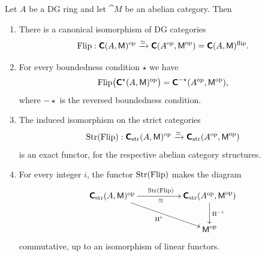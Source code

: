 \begin{thm} \label{thm:2495}
Let $A$ be a DG ring and let $\cat{M}$ be an abelian category. Then\tup{:}
\begin{enumerate}
\item There is a canonical isomorphism of DG categories  
\[ \operatorname{Flip} : 
\boldsymbol{\mathsf{C}}(A, \operatorname{\mathsf{M}})^{\mathrm{op}} \xrightarrow{\simeq} 
\boldsymbol{\mathsf{C}}(A^{\mathrm{op}}, \operatorname{\mathsf{M}}^{\mathrm{op}}) = \boldsymbol{\mathsf{C}}(A, \operatorname{\mathsf{M}})^{\mathrm{flip}} . 
\]

\item For every boundedness condition $\star$ we have 
\[ \operatorname{Flip} \bigl( \boldsymbol{\mathsf{C}}^{\star}(A, \operatorname{\mathsf{M}})^{\mathrm{op}} \bigr) = 
\boldsymbol{\mathsf{C}}^{-\star}(A^{\mathrm{op}}, \operatorname{\mathsf{M}}^{\mathrm{op}}) , \]
where $-\star$ is the reversed boundedness condition. 

\item The induced isomorphism on the strict categories
\[ \operatorname{Str}(\operatorname{Flip}) : \boldsymbol{\mathsf{C}}_{\mathrm{str}}(A, \operatorname{\mathsf{M}})^{\mathrm{op}} \xrightarrow{\simeq} 
\boldsymbol{\mathsf{C}}_{\mathrm{str}}(A^{\mathrm{op}}, \operatorname{\mathsf{M}}^{\mathrm{op}}) \]
is an exact functor, for the respective abelian category structures.

\item For every integer $i$, the functor $\operatorname{Str}(\operatorname{Flip})$ makes the 
diagram 
\[ \UseTips  \xymatrix @C=12ex @R=6ex {
\dcat{C}_{\mrm{str}}(A, \cat{M})^{\mrm{op}}
\ar[r]^{\opn{Str}(\opn{Flip})}_{\cong}
\ar[dr]_{\opn{H}^i}
&
\dcat{C}_{\mrm{str}}(A^{\mrm{op}}, \cat{M}^{\mrm{op}})
\ar[d]^{\opn{H}^{-i}}
\\
&
\cat{M}^{\mrm{op}}
} \]
commutative, up to an isomorphism of linear functors. 
\end{enumerate}
\end{thm}

